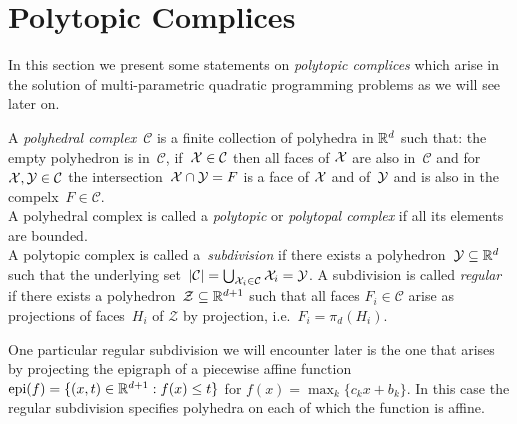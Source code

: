 \section{Polytopic Complices}\label{ch:concepts:sec:polytopes:complices}
\resetforsection
%
%
%
In this section we present some statements on \emph{polytopic complices} which arise in the solution of multi-parametric quadratic programming problems as we will see later on.
%
\begin{defi}
A \emph{polyhedral complex}~$\mathcal C$ is a finite collection of polyhedra in $\mathbb R^d$ such that: the empty polyhedron is in~$\mathcal C$, if~$\mathcal X\in\mathcal C$ then all faces of $\mathcal X$ are also in~$\mathcal C$ and for~$\mathcal X,\mathcal Y\in\mathcal C$ the intersection~$\mathcal X\cap\mathcal Y=F$ is a face of $\mathcal X$ and of~$\mathcal Y$ and is also in the compelx~$F\in\mathcal C$.
%
\\[1em]
%
A polyhedral complex is called a \emph{polytopic} or \emph{polytopal complex} if all its elements are bounded.
%
\\[1em]
%
A polytopic complex is called a~\emph{subdivision} if there exists a polyhedron~$\mathcal Y\subseteq\mathbb R^d$ such that the underlying set~$\left|\mathcal C\right|=\bigcup_{\mathcal X_i\in\mathcal C}\mathcal X_i = \mathcal Y$.
%
A subdivision is called \emph{regular} if there exists a polyhedron~$\mathcal Z\subseteq\mathbb R^{d+1}$ such that all faces $F_i\in\mathcal C$ arise as projections of faces~$H_i$ of $\mathcal Z$ by projection, i.e.~$F_i=\pi_d(H_i)$.
\end{defi}
%
\noindent One particular regular subdivision we will encounter later is the one that arises by projecting the epigraph of a piecewise affine function~$\text{epi}(f)=\{(x,t)\in\mathbb R^{d+1}:f(x)\leq t\}$ for $f(x)=\max_{k}\{c_k x+ b_k\}$.
%
In this case the regular subdivision specifies polyhedra on each of which the function is affine.
%
